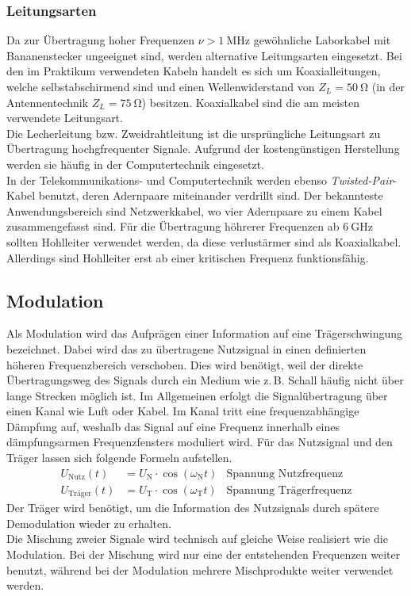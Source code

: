 \documentclass[a4paper,twoside,final]{article}
\begin{document}
\subsubsection{Leitungsarten}
Da zur Übertragung hoher Frequenzen $\nu > \SI{1}{\mega\hertz}$ gewöhnliche Laborkabel mit Bananenstecker ungeeignet sind, werden alternative Leitungsarten eingesetzt. Bei den im Praktikum verwendeten Kabeln handelt es sich um Koaxialleitungen, welche selbstabschirmend sind und einen Wellenwiderstand von $Z_L = \SI{50}{\ohm}$ (in der Antennentechnik $Z_L = \SI{75}{\ohm}$) besitzen. Koaxialkabel sind die am meisten verwendete Leitungsart.\\
Die Lecherleitung bzw. Zweidrahtleitung ist die ursprüngliche Leitungsart zu Übertragung hochgfrequenter Signale. Aufgrund der kostengünstigen Herstellung werden sie häufig in der Computertechnik eingesetzt.\\
In der Telekommunikations- und Computertechnik werden ebenso \textit{Twisted-Pair}-Kabel benutzt, deren Adernpaare miteinander verdrillt sind. Der bekannteste Anwendungsbereich sind Netzwerkkabel, wo vier Adernpaare zu einem Kabel zusammengefasst sind.
Für die Übertragung höhrerer Frequenzen ab $\SI{6}{\giga\hertz}$ sollten Hohlleiter verwendet werden, da diese verlustärmer sind als Koaxialkabel. Allerdings sind Hohlleiter erst ab einer kritischen Frequenz funktionsfähig.

\subsection{Modulation}
Als Modulation wird das Aufprägen einer Information auf eine Trägerschwingung bezeichnet. Dabei wird das zu übertragene Nutzsignal in einen definierten höheren Frequenzbereich verschoben. Dies wird benötigt, weil der direkte Übertragungsweg des Signals durch ein Medium wie z.\,B. Schall häufig nicht über lange Strecken möglich ist. Im Allgemeinen erfolgt die Signalübertragung über einen Kanal wie Luft oder Kabel. Im Kanal tritt eine frequenzabhängige Dämpfung auf, weshalb das Signal auf eine Frequenz innerhalb eines dämpfungsarmen Frequenzfensters moduliert wird. Für das Nutzsignal und den Träger lassen sich folgende Formeln aufstellen.
\begin{align}
    U_\text{Nutz}(t) &= U_\text{N}\cdot\cos(\omega_\text{N}t) & \text{Spannung Nutzfrequenz}\\
    U_\text{Träger}(t) &= U_\text{T}\cdot\cos(\omega_\text{T}t) & \text{Spannung Trägerfrequenz}
\end{align}
Der Träger wird benötigt, um die Information des Nutzsignals durch spätere Demodulation wieder zu erhalten.\\
Die Mischung zweier Signale wird technisch auf gleiche Weise realisiert wie die Modulation. Bei der Mischung wird nur eine der entstehenden Frequenzen weiter benutzt, während bei der Modulation mehrere Mischprodukte weiter verwendet werden.
\end{document}
